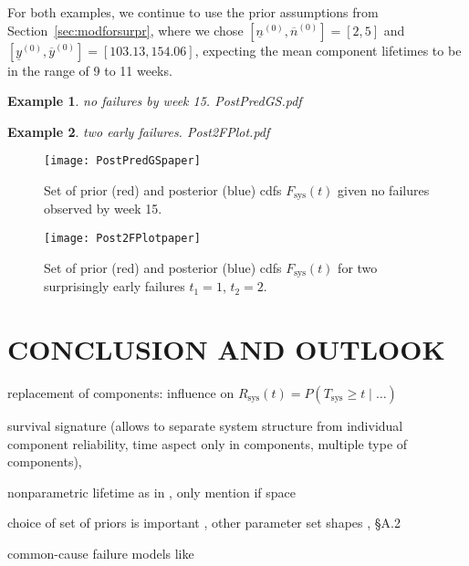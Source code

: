 \documentclass[12pt,a4paper,twocolumn,fleqn]{narms}
\newcommand{\uz}{^{(0)}} %
\newcommand{\ul}[1]{\underline{#1}}
\newcommand{\ol}[1]{\overline{#1}}
\def\yzl{\ul{y}\uz}
\def\yzu{\ol{y}\uz}
\def\nzl{\ul{n}\uz}
\def\nzu{\ol{n}\uz}
\newcommand{\comments}[1]{{\small\color{gray} #1}}
\newtheorem{example}{Example}
\begin{document}
For both examples, we continue to use the prior assumptions from Section~\ref{sec:modforsurpr},
where we chose $[\nzl, \nzu] = [2,5]$ and $[\yzl, \yzu] = [103.13, 154.06]$,
expecting the mean component lifetimes to be in the range of 9 to 11 weeks.

\begin{example}
no failures by week 15. PostPredGS.pdf
\end{example}

\begin{example}
two early failures. Post2FPlot.pdf
\end{example}

\begin{figure}
\texttt{[image: PostPredGSpaper]}
\caption{Set of prior (red) and posterior (blue) cdfs $F_\text{sys}(t)$ given no failures observed by week 15.}
\label{fig:examplenofailures}
\end{figure}

\begin{figure}
\texttt{[image: Post2FPlotpaper]}
\caption{Set of prior (red) and posterior (blue) cdfs $F_\text{sys}(t)$ for two surprisingly early failures $t_1 = 1$, $t_2 = 2$.}
\label{fig:exampletwoearlyfailures}
\end{figure}

\section{CONCLUSION AND OUTLOOK}

replacement of components: influence on $R_\text{sys}(t) = P(T_\text{sys} \geq t \mid \ldots)$ 

survival signature \cite{2012:survsign} (allows to separate system structure from individual component reliability,
time aspect only in components, multiple type of components),

nonparametric lifetime as in , \comments{only mention if space}

choice of set of priors is important \cite{1991:pericchi},
other parameter set shapes \cite{Walter2011a}, \cite{diss} \S A.2

common-cause failure models like \cite{Troffaes2014a,2015:coolen-commoncause}



\end{document}
